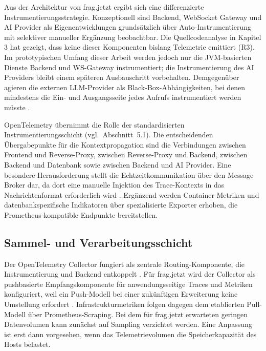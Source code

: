 Aus der Architektur von frag.jetzt ergibt sich eine differenzierte Instrumentierungsstrategie. Konzeptionell sind Backend, WebSocket Gateway und AI Provider als Eigenentwicklungen grundsätzlich über Auto-Instrumentierung mit selektiver manueller Ergänzung beobachtbar. Die Quellcodeanalyse in Kapitel 3 hat gezeigt, dass keine dieser Komponenten bislang Telemetrie emittiert (R3). Im prototypischen Umfang dieser Arbeit werden jedoch nur die JVM-basierten Dienste Backend und WS-Gateway instrumentiert; die Instrumentierung des AI Providers bleibt einem späteren Ausbauschritt vorbehalten. Demgegenüber agieren die externen LLM-Provider als Black-Box-Abhängigkeiten, bei denen mindestens die Ein- und Ausgangsseite jedes Aufrufs instrumentiert werden müsste \parencite[S.~31]{bissig2024unified}.
 
OpenTelemetry übernimmt die Rolle der standardisierten Instrumentierungsschicht (vgl.~Abschnitt~5.1). Die entscheidenden Übergabepunkte für die Kontextpropagation sind die Verbindungen zwischen Frontend und Reverse-Proxy, zwischen Reverse-Proxy und Backend, zwischen Backend und Datenbank sowie zwischen Backend und AI Provider. Eine besondere Herausforderung stellt die Echtzeitkommunikation über den Message Broker dar, da dort eine manuelle Injektion des Trace-Kontexts in das Nachrichtenformat erforderlich wird \parencite[S.~25]{sundstrom2025finding}. Ergänzend werden Container-Metriken und datenbankspezifische Indikatoren über spezialisierte Exporter erhoben, die Prometheus-kompatible Endpunkte bereitstellen.
 
 
\subsection{Sammel- und Verarbeitungsschicht}
 
Der OpenTelemetry Collector fungiert als zentrale Routing-Komponente, die Instrumentierung und Backend entkoppelt \parencite[S.~107]{sakinala2025observability}. Für frag.jetzt wird der Collector als pushbasierte Empfangskomponente für anwendungsseitige Traces und Metriken konfiguriert, weil ein Push-Modell bei einer zukünftigen Erweiterung keine Umstellung erfordert \parencite[S.~39]{bissig2024unified}. Infrastrukturmetriken folgen dagegen dem etablierten Pull-Modell über Prometheus-Scraping. Bei dem für frag.jetzt erwarteten geringen Datenvolumen kann zunächst auf Sampling verzichtet werden. Eine Anpassung ist erst dann vorgesehen, wenn das Telemetrievolumen die Speicherkapazität des Hosts belastet.
 
